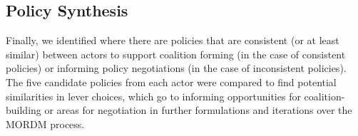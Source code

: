 \subsection{Policy Synthesis}
Finally, we identified where there are policies that are consistent (or at least similar) between actors to support coalition forming (in the case of consistent policies) or informing policy negotiations (in the case of inconsistent policies). The five candidate policies from each actor were compared to find potential similarities in lever choices, which go to informing opportunities for coalition-building or areas for negotiation in further formulations and iterations over the MORDM process.



